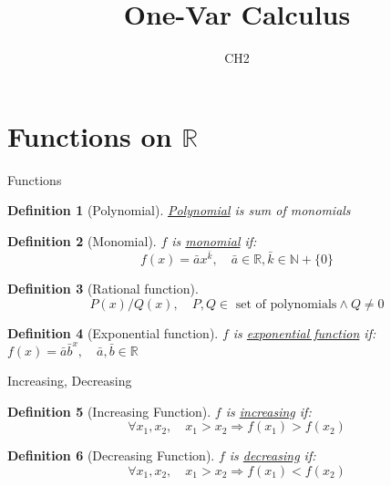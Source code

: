 \documentclass[a4paper,11pt]{article}
\author[조남운]{\mail}
\title{One-Var Calculus}
\subtitle{CH2}
\newtheorem{defn}{Definition}
\begin{document}
	\maketitle


\section{Functions on $\mathbb{R}$} %
\begin{frame}[t]{Functions}

	\begin{defn}[Polynomial]
		\uline{Polynomial} is sum of monomials
	\end{defn}
	
	\begin{defn}[Monomial]
		$f$ is \uline{monomial} if:
			\[
				f(x) = \bar a x^{\bar k},\quad \bar a \in \mathbb{R}, \bar k\in \mathbb{N}+\{0\}
			\]
	\end{defn}

	\begin{defn}
		[Rational function]
		\[
			P(x)/Q(x),\quad \text{$P,Q \in$ set of polynomials} \land Q\neq 0
		\]
	\end{defn}
	
	\begin{defn}
		[Exponential function]
		$f$ is \uline{exponential function} if: $
			f(x) = \bar a {\bar b}^x,\quad \bar a, \bar b \in \mathbb{R}
		$
	\end{defn}

\end{frame}

\begin{frame}[t]{Increasing, Decreasing}
	\begin{defn}
		[Increasing Function]
		$f$ is \uline{increasing} if:\[
			\forall x_1,x_2, \quad x_1 >x_2 \Rightarrow f(x_1)>f(x_2)
		\]
	\end{defn}
	\begin{defn}
		[Decreasing Function]
		$f$ is \uline{decreasing} if:\[
			\forall x_1,x_2, \quad x_1 >x_2 \Rightarrow f(x_1)<f(x_2)
		\]
	\end{defn}
\end{frame}
\end{document}
